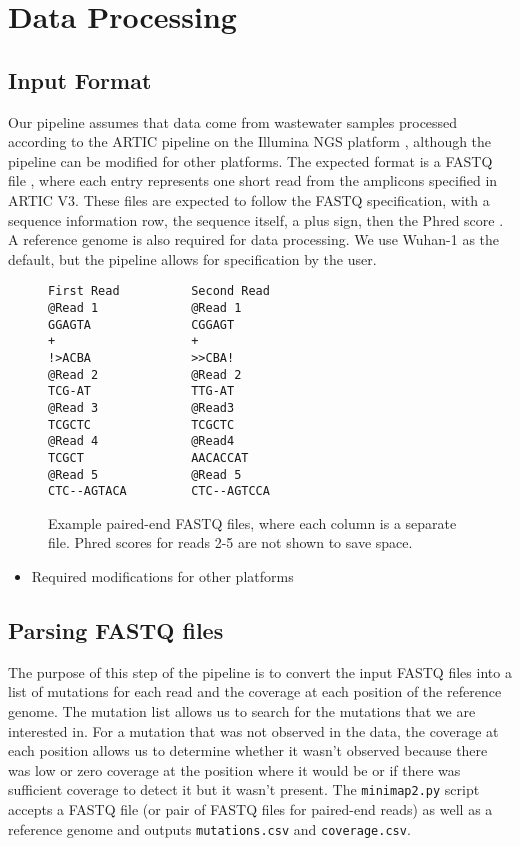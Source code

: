 \documentclass{article}
\newenvironment{tightemize}
{ \begin{itemize}
    \setlength{\itemsep}{0pt}
    \setlength{\parskip}{0pt}
    \setlength{\parsep}{0pt}     }
{ \end{itemize}                  }
\begin{document}
\section{Data Processing}

\subsection{Input Format}

Our pipeline assumes that data come from wastewater samples processed according to the ARTIC pipeline \citep{needed} on the Illumina NGS platform \citep{needed}, although the pipeline can be modified for other platforms.
The expected format is a FASTQ file \citep{needed}, where each entry represents one short read from the amplicons specified in ARTIC V3. %
These files are expected to follow the FASTQ specification, with a sequence information row, the sequence itself, a plus sign, then the Phred score \citep{needed}.
A reference genome is also required for data processing.
We use Wuhan-1 \citep{needed} as the default, but the pipeline allows for specification by the user.


\begin{figure}[h!]
\begin{verbatim}
First Read          Second Read
@Read 1             @Read 1
GGAGTA              CGGAGT
+                   +
!>ACBA              >>CBA!
@Read 2             @Read 2
TCG-AT              TTG-AT
@Read 3             @Read3  
TCGCTC              TCGCTC
@Read 4             @Read4
TCGCT               AACACCAT
@Read 5             @Read 5
CTC--AGTACA         CTC--AGTCCA
\end{verbatim}
\caption{Example paired-end FASTQ files, where each column is a separate file.
Phred scores for reads 2-5 are not shown to save space.}
\label{short-reads}
\end{figure}



\begin{tightemize} 
    \item Required modifications for other platforms
\end{tightemize}

\subsection{Parsing FASTQ files}

The purpose of this step of the pipeline is to convert the input FASTQ files into a list of mutations for each read and the coverage at each position of the reference genome.
The mutation list allows us to search for the mutations that we are interested in.
For a mutation that was not observed in the data, the coverage at each position allows us to determine whether it wasn't observed because there was low or zero coverage at the position where it would be or if there was sufficient coverage to detect it but it wasn't present.
The \texttt{minimap2.py} script accepts a FASTQ file (or pair of FASTQ files for paired-end reads) as well as a reference genome and outputs \texttt{mutations.csv} and \texttt{coverage.csv}.
\end{document}
